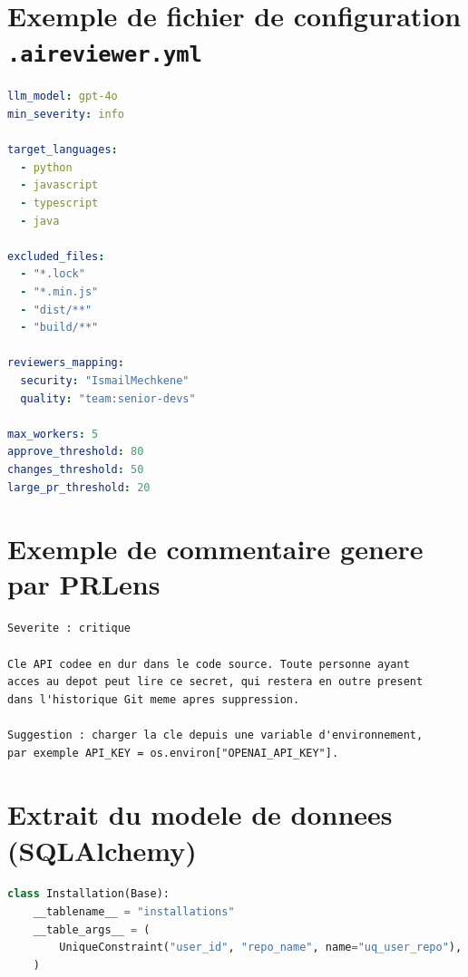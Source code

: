 \documentclass[a4paper,12pt,oneside]{report}
\begin{document}
\begin{appendices}

\chapter{Exemple de fichier de configuration \texttt{.aireviewer.yml}}

\begin{lstlisting}[language=yaml,caption={Exemple de fichier de configuration place a la racine d'un depot},label={lst:config}]
llm_model: gpt-4o
min_severity: info

target_languages:
  - python
  - javascript
  - typescript
  - java

excluded_files:
  - "*.lock"
  - "*.min.js"
  - "dist/**"
  - "build/**"

reviewers_mapping:
  security: "IsmailMechkene"
  quality: "team:senior-devs"

max_workers: 5
approve_threshold: 80
changes_threshold: 50
large_pr_threshold: 20
\end{lstlisting}

\chapter{Exemple de commentaire genere par PRLens}

\begin{lstlisting}[caption={Extrait d'un commentaire en ligne genere automatiquement},label={lst:comment}]
Severite : critique

Cle API codee en dur dans le code source. Toute personne ayant
acces au depot peut lire ce secret, qui restera en outre present
dans l'historique Git meme apres suppression.

Suggestion : charger la cle depuis une variable d'environnement,
par exemple API_KEY = os.environ["OPENAI_API_KEY"].
\end{lstlisting}

\chapter{Extrait du modele de donnees (SQLAlchemy)}

\begin{lstlisting}[language=Python,caption={Modele \texttt{Installation} (extrait simplifie)},label={lst:model}]
class Installation(Base):
    __tablename__ = "installations"
    __table_args__ = (
        UniqueConstraint("user_id", "repo_name", name="uq_user_repo"),
    )


\end{lstlisting}
\end{appendices}
\end{document}
